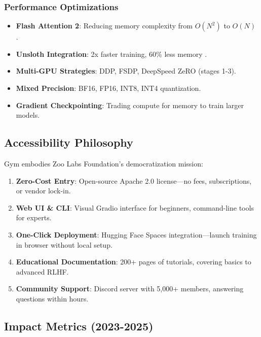\subsubsection{Performance Optimizations}
\begin{itemize}
    \item \textbf{Flash Attention 2}: Reducing memory complexity from $O(N^2)$ to $O(N)$ \citep{dao2023flashattention2}.
    \item \textbf{Unsloth Integration}: 2x faster training, 60\% less memory \citep{unsloth2024}.
    \item \textbf{Multi-GPU Strategies}: DDP, FSDP, DeepSpeed ZeRO (stages 1-3).
    \item \textbf{Mixed Precision}: BF16, FP16, INT8, INT4 quantization.
    \item \textbf{Gradient Checkpointing}: Trading compute for memory to train larger models.
\end{itemize}

\subsection{Accessibility Philosophy}

Gym embodies Zoo Labs Foundation's democratization mission:

\begin{enumerate}
    \item \textbf{Zero-Cost Entry}: Open-source Apache 2.0 license—no fees, subscriptions, or vendor lock-in.
    \item \textbf{Web UI \& CLI}: Visual Gradio interface for beginners, command-line tools for experts.
    \item \textbf{One-Click Deployment}: Hugging Face Spaces integration—launch training in browser without local setup.
    \item \textbf{Educational Documentation}: 200+ pages of tutorials, covering basics to advanced RLHF.
    \item \textbf{Community Support}: Discord server with 5,000+ members, answering questions within hours.
\end{enumerate}

\subsection{Impact Metrics (2023-2025)}

